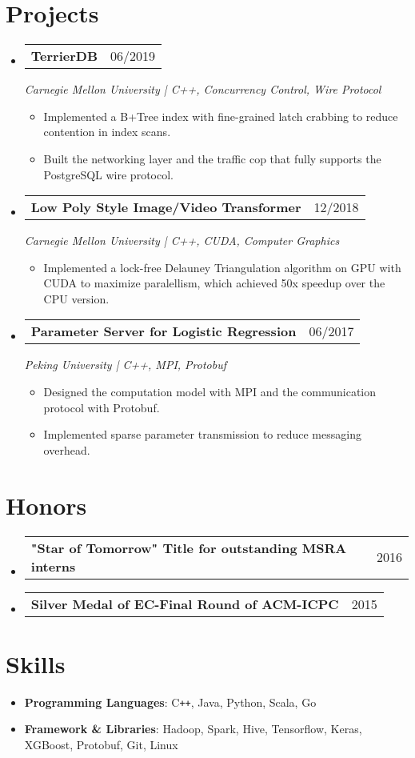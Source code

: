 \documentclass[a4paper,11pt]{article}
\makeatletter
\newcommand{\resumeItem}[1]{
  \item\small{#1 \vspace{-2pt}}
}
\newcommand{\resumeSubheading}[3]{
  \vspace{-1pt}\item
    \begin{tabular*}{0.97\textwidth}{l@{\extracolsep{\fill}}r}
      \textbf{#1} & #2
      \end{tabular*}
      \textit{\small#3}
}
\newcommand{\resumeMiniheading}[2]{
  \vspace{-1pt}\item
    \begin{tabular*}{0.97\textwidth}{l@{\extracolsep{\fill}}r}
      \textbf{#1} & #2
    \end{tabular*}
}
\newcommand{\resumeItemListStart}{\begin{itemize}[leftmargin=*, topsep=0ex]}
\newcommand{\resumeItemListEnd}{\end{itemize}}
\makeatother
\begin{document}
\section{Projects}
  \begin{itemize}[leftmargin=*, itemsep=5pt, label={}]
    \resumeSubheading{TerrierDB}{06/2019}
    {Carnegie Mellon University | C++, Concurrency Control, Wire Protocol}
    \resumeItemListStart
        \resumeItem {Implemented a B+Tree index with fine-grained latch crabbing to reduce contention in index scans.}
        \resumeItem {Built the networking layer and the traffic cop that fully supports the PostgreSQL wire protocol.}
    \resumeItemListEnd
    
    \resumeSubheading {Low Poly Style Image/Video Transformer} {12/2018}
    {Carnegie Mellon University | C++, CUDA, Computer Graphics}
    \resumeItemListStart
        \resumeItem {Implemented a lock-free Delauney Triangulation algorithm on GPU with CUDA to maximize paralellism, which achieved 50x speedup over the CPU version.}
    \resumeItemListEnd
    
    \resumeSubheading{Parameter Server for Logistic Regression}{06/2017}
    {Peking University | C++, MPI, Protobuf}
        \resumeItemListStart
            \resumeItem {Designed the computation model with MPI and the communication protocol with Protobuf.}
            \resumeItem {Implemented sparse parameter transmission to reduce messaging overhead.}
        \resumeItemListEnd
        
  \end{itemize}

\section{Honors}
  \begin{itemize}[leftmargin=*, itemsep=-1pt, label={}]
    \resumeMiniheading{"Star of Tomorrow" Title for outstanding MSRA interns \normalfont{(Rate: 10\%)}}{2016}
    \resumeMiniheading{Silver Medal of EC-Final Round of ACM-ICPC}{2015}
  \end{itemize}

\section{Skills}
  \begin{itemize}[leftmargin=*, itemsep=-2pt, label={}]
    \item{
      \textbf{Programming Languages}{: C\texttt{++}, Java, Python, Scala, Go}
    }
    \item{
      \textbf{Framework \& Libraries}{: Hadoop, Spark, Hive, Tensorflow, Keras, XGBoost, Protobuf, Git, Linux}
    }
  \end{itemize}


\end{document}
